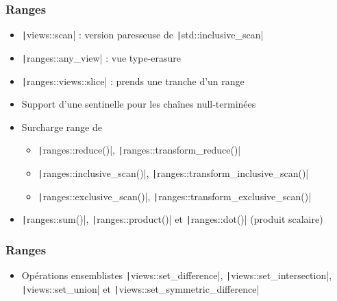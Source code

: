 \documentclass[C++.tex]{subfiles}
\begin{document}
\begin{frame}[fragile]
	\frametitle{Ranges}
	\begin{itemize}
		\item \texttt|views::scan| : version paresseuse de \texttt|std::inclusive_scan|
		\item \texttt|ranges::any_view| : vue \og{}type-erasure\fg{}
		\item \texttt|ranges::views::slice| : prends une tranche d'un range
		\item Support d'une sentinelle pour les chaînes null-terminées
		\item Surcharge range de
		\begin{itemize}
			\item \texttt|ranges::reduce()|, \texttt|ranges::transform_reduce()|
			\item \texttt|ranges::inclusive_scan()|, \texttt|ranges::transform_inclusive_scan()|
			\item \texttt|ranges::exclusive_scan()|, \texttt|ranges::transform_exclusive_scan()|
		\end{itemize}
		\item \texttt|ranges::sum()|, \texttt|ranges::product()| et \texttt|ranges::dot()| (produit scalaire)

	\end{itemize}

\end{frame}

\begin{frame}[fragile]
	\frametitle{Ranges}
	\begin{itemize}
		\item Opérations ensemblistes \texttt|views::set_difference|, \texttt|views::set_intersection|, \texttt|views::set_union| et \texttt|views::set_symmetric_difference|
	\end{itemize}

\end{frame}
\end{document}

